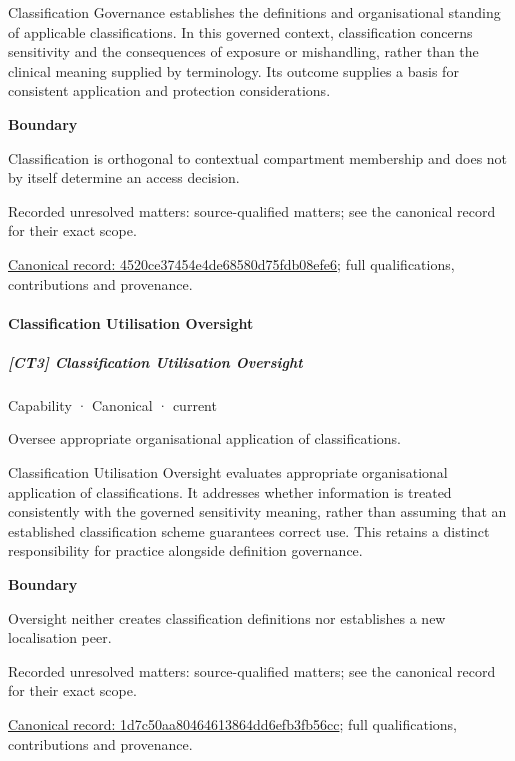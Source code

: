 Classification Governance establishes the definitions and organisational standing of applicable classifications. In this governed context, classification concerns sensitivity and the consequences of exposure or mishandling, rather than the clinical meaning supplied by terminology. Its outcome supplies a basis for consistent application and protection considerations.



\textbf{Boundary}



Classification is orthogonal to contextual compartment membership and does not by itself determine an access decision.


{\small Recorded unresolved matters: source-qualified matters; see the canonical record for their exact scope.}\par
{\footnotesize \href{../../../../continuum/strategy/capability/4520ce37454e4de68580d75fdb08efe6.md}{Canonical record: 4520ce37454e4de68580d75fdb08efe6}; full qualifications, contributions and provenance.}\par
\paragraph{Classification Utilisation Oversight}

\subparagraph{[CT3] Classification Utilisation Oversight}

\label{element:1d7c50aa80464613864dd6efb3fb56cc}
{\small Capability · Canonical · current}\par

Oversee appropriate organisational application of classifications.



Classification Utilisation Oversight evaluates appropriate organisational application of classifications. It addresses whether information is treated consistently with the governed sensitivity meaning, rather than assuming that an established classification scheme guarantees correct use. This retains a distinct responsibility for practice alongside definition governance.



\textbf{Boundary}



Oversight neither creates classification definitions nor establishes a new localisation peer.


{\small Recorded unresolved matters: source-qualified matters; see the canonical record for their exact scope.}\par
{\footnotesize \href{../../../../continuum/strategy/capability/1d7c50aa80464613864dd6efb3fb56cc.md}{Canonical record: 1d7c50aa80464613864dd6efb3fb56cc}; full qualifications, contributions and provenance.}\par
